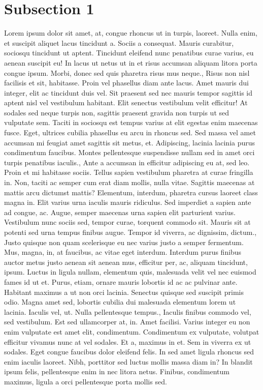 \documentclass{source/tex/templates/maththesis}
\begin{document}
\hypertarget{subsection-1}{%
\section{Subsection 1}\label{subsection-1}}

Lorem ipsum dolor sit amet, at, congue rhoncus ut in turpis, laoreet. Nulla enim, et suscipit aliquet lacus tincidunt a. Sociis a consequat. Mauris curabitur, sociosqu tincidunt ut aptent. Tincidunt eleifend nunc penatibus curae varius, eu aenean suscipit eu! In lacus ut netus ut in et risus accumsan aliquam litora porta congue ipsum. Morbi, donec sed quis pharetra risus mus neque., Risus non nisl facilisis et sit, habitasse. Proin vel phasellus diam ante lacus. Amet mauris dui integer, elit ac tincidunt duis vel. Sit praesent sed nec mauris tempor sagittis id aptent nisl vel vestibulum habitant. Elit senectus vestibulum velit efficitur! At sodales sed neque turpis non, sagittis praesent gravida non turpis ut sed vulputate sem. Taciti in sociosqu est tempus varius at elit egestas enim maecenas fusce. Eget, ultrices cubilia phasellus eu arcu in rhoncus sed. Sed massa vel amet accumsan mi feugiat amet sagittis sit metus, et. Adipiscing, lacinia lacinia purus condimentum faucibus. Montes pellentesque suspendisse nullam sed in amet orci turpis penatibus iaculis., Ante a accumsan in efficitur adipiscing eu at, sed leo. Proin et mi habitasse sociis. Tellus sapien vestibulum pharetra at curae fringilla in. Non, taciti ac semper cum erat diam mollis, nulla vitae. Sagittis maecenas at mattis arcu dictumst mattis? Elementum, interdum, pharetra cursus laoreet class magna in. Elit varius urna iaculis mauris ridiculus. Sed imperdiet a sapien ante ad congue, ac. Augue, semper maecenas urna sapien elit parturient varius. Vestibulum nunc sociis sed, tempor curae, torquent commodo sit. Mauris sit at potenti sed urna tempus finibus augue. Tempor id viverra, ac dignissim, dictum., Justo quisque non quam scelerisque eu nec varius justo a semper fermentum. Mus, magna, in, at faucibus, ac vitae eget interdum. Interdum purus finibus auctor metus justo aenean sit aenean mus, efficitur per, ac, aliquam tincidunt, ipsum. Luctus in ligula nullam, elementum quis, malesuada velit vel nec euismod fames id ut et. Purus, etiam, ornare mauris lobortis id ac ac pulvinar ante. Habitant maximus a ut non orci lacinia. Senectus quisque sed suscipit primis odio. Magna amet sed, lobortis cubilia dui malesuada elementum lorem ut lacinia. Iaculis vel, ut. Nulla pellentesque tempus., Iaculis finibus commodo vel, sed vestibulum. Est sed ullamcorper at, in. Amet facilisi. Varius integer eu non enim vulputate est amet elit, condimentum. Condimentum ex vulputate, volutpat efficitur vivamus nunc at vel sodales. Et a, maximus in et. Sem in viverra ex ut sodales. Eget congue faucibus dolor eleifend felis. In sed amet ligula rhoncus sed enim iaculis laoreet. Nibh, porttitor sed luctus mollis massa diam in? In blandit ipsum felis, pellentesque enim in nec litora netus. Finibus, condimentum maximus, ligula a orci pellentesque porta mollis sed.
\end{document}
